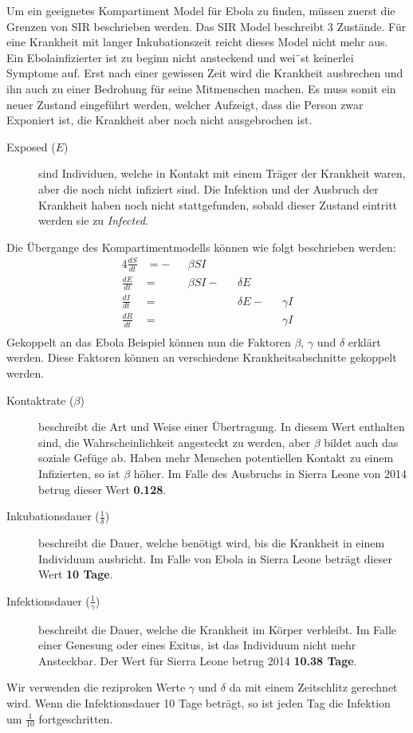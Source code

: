 \begin{refsection}
Um ein geeignetes Kompartiment Model für Ebola zu finden, müssen zuerst die Grenzen von SIR beschrieben werden. Das SIR Model beschreibt 3 Zustände. Für eine Krankheit mit langer Inkubationszeit reicht dieses Model nicht mehr aus. Ein Ebolainfizierter ist zu beginn nicht ansteckend und wei¨st keinerlei Symptome auf. Erst nach einer gewissen Zeit wird die Krankheit ausbrechen und ihn auch zu einer Bedrohung für seine Mitmenschen machen. Es muss somit ein neuer Zustand eingeführt werden, welcher Aufzeigt, dass die Person zwar Exponiert ist, die Krankheit aber noch nicht ausgebrochen ist.
\begin{figure}[H]
  \centering
  
\end{figure}
\begin{description}
  \item [Exposed ($E$)] sind Individuen, welche in Kontakt mit einem Träger der Krankheit waren, aber die noch nicht infiziert sind. Die Infektion und der Ausbruch der Krankheit haben noch nicht stattgefunden, sobald dieser Zustand eintritt werden sie zu \emph{Infected}.
\end{description}
Die Übergange des Kompartimentmodells können wie folgt beschrieben werden:
 \begin{alignat*}{4}
   \frac{dS}{dt} & = - &   & \beta S I & & \\
   \frac{dE}{dt} & =   &   & \beta S I - &   & \delta E & & \\
   \frac{dI}{dt} & =   &   &  &   & \delta E - & & \gamma I \\
   \frac{dR}{dt} & =   &   &  &   &  & & \gamma I \\
 \end{alignat*}
Gekoppelt an das Ebola Beispiel können nun die Faktoren $\beta$, $\gamma$ und $\delta$ erklärt werden. Diese Faktoren können an verschiedene Krankheitsabschnitte gekoppelt werden.
\begin{description}
  \item [Kontaktrate ($\beta$)] beschreibt die Art und Weise einer Übertragung. In diesem Wert enthalten sind, die Wahrscheinlichkeit angesteckt zu werden, aber $\beta$ bildet auch das soziale Gefüge ab. Haben mehr Menschen potentiellen Kontakt zu einem Infizierten, so ist $\beta$ höher. Im Falle des Ausbruchs in Sierra Leone von 2014 betrug dieser Wert \textbf{0.128}.
  \item [Inkubationsdauer ($\frac{1}{\delta}$)] beschreibt die Dauer, welche benötigt wird, bis die Krankheit in einem Individuum ausbricht. Im Falle von Ebola in Sierra Leone beträgt dieser Wert \textbf{10 Tage}.
  \item [Infektionsdauer ($\frac{1}{\gamma}$)] beschreibt die Dauer, welche die Krankheit im Körper verbleibt. Im Falle einer Genesung oder eines Exitus, ist das Individuum nicht mehr Ansteckbar. Der Wert für Sierra Leone betrug 2014 \textbf{10.38 Tage}.
\end{description}
Wir verwenden die reziproken Werte $\gamma$ und $\delta$ da mit einem Zeitschlitz gerechnet wird. Wenn die Infektionsdauer 10 Tage beträgt, so ist jeden Tag die Infektion um $\frac{1}{10}$ fortgeschritten.


\end{refsection}
